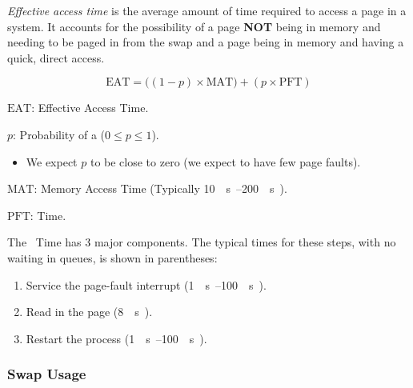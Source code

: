 \begin{definition}\label{def:Effective_Access_Time}
  \emph{Effective access time} is the average amount of time required to access a page in a  system.
  It accounts for the possibility of a page \textbf{NOT} being in memory and needing to be paged in from the swap and a page being in memory and having a quick, direct access.

  \begin{equation}\label{eq:Effective_Access_Time}
    \mathrm{EAT} = \bigl( (1-p) \times \mathrm{MAT} \bigr) + (p \times \mathrm{PFT})
  \end{equation}
  \begin{description}[noitemsep]
  \item $\mathrm{EAT}$: Effective Access Time.
  \item $p$: Probability of a  ($0 \leq p \leq 1$).
    \begin{itemize}[noitemsep]
    \item We expect $p$ to be close to zero (we expect to have few page faults).
    \end{itemize}
  \item $\mathrm{MAT}$: Memory Access Time (Typically \SIrange{10}{200}{\nano{} \second{}}).
  \item $\mathrm{PFT}$:  Time.
  \end{description}
\end{definition}

The ~Time has 3 major components.
The typical times for these steps, with no waiting in queues, is shown in parentheses:
\begin{enumerate}[noitemsep]
\item Service the page-fault interrupt (\SIrange{1}{100}{\micro{} \second{}}).
\item Read in the page (\SI{8}{\milli{} \second{}}).
\item Restart the process (\SIrange{1}{100}{\micro{} \second{}}).
\end{enumerate}

\subsubsection{Swap Usage}\label{subsubsec:Demand_Paging_Swap_Usage}

